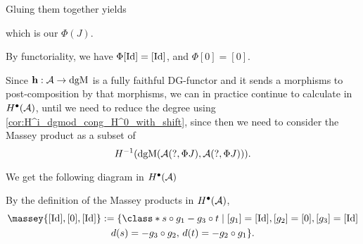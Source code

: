 \begin{example}
    Gluing them together yields
    \begin{center}
    \end{center}
    which is our \( \Phi(J) \).

    By functoriality, we have \( \Phi [\operatorname{Id}] = [\operatorname{Id}] \), and \( \Phi [0] = [0] \).

    Since \( \mathbf{h}: {\mathcal{A}} \to \operatorname{dgM} \) is a fully faithful DG-functor and it sends a morphisms to post-composition by that morphisms, we can in practice continue to calculate in \( H^{\bullet}({\mathcal{A}}) \), until we need to reduce the degree using \autoref{cor:H^i_dgmod_cong_H^0_with_shift}, since then we need to consider the Massey product as a subset of
    \[
        H^{-1}(\operatorname{dgM}({\mathcal{A}}(?, \Phi J), {\mathcal{A}}(?, \Phi J))).
    \]

    We get the following diagram in \( H^{\bullet}({\mathcal{A}}) \)
    \begin{center}
	\end{center}

    By the definition of the Massey products in \( H^\bullet({\mathcal{A}}) \),
    \begin{multline*}
        \massey{[\Id], [0], [\Id]} :=
        \{
            \class*{
                s \circ g_1 - g_3 \circ t
            }
            \mid [g_1] = [\Id], [g_2] = [0], [g_3] = [\Id] \\
            d(s) = - g_3 \circ g_2, \,
            d(t) = - g_2 \circ g_1
        \}.
    \end{multline*}


\end{example}
